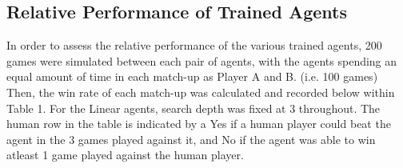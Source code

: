 \documentclass[a4paper,12pt,table]{article}
\begin{document}
\subsection{Relative Performance of Trained Agents}
In order to assess the relative performance of the various trained agents, 200 games were simulated between each pair of agents, with the agents spending an equal amount of time in each match-up as Player A and B. (i.e. 100 games) Then, the win rate of each match-up was calculated and recorded below within Table 1. For the Linear agents, search depth was fixed at 3 throughout. The human row in the table is indicated by a Yes if a human player could beat the agent in the 3 games played against it, and No if the agent was able to win atleast 1 game played against the human player.


\begin{table}[H]
\end{table}
\end{document}
